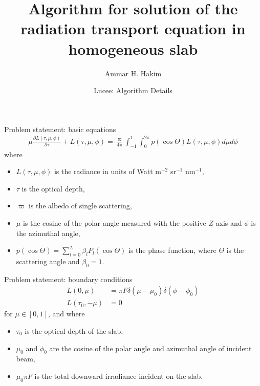 \documentclass[14]{beamer}
\title[RTE in homogeneous slab]{%
  Algorithm for solution of the radiation transport equation in homogeneous slab}
\author{Ammar H. Hakim}
\date[Lucee]
{Lucee: Algorithm Details}
\newcommand{\pfrac}[2]{\frac{\partial #1}{\partial #2}}
\begin{document}
\begin{frame}
  \titlepage
\end{frame}

\begin{frame}{Problem statement: basic equations}
  \begin{align}
    \mu\pfrac{L(\tau,\mu,\phi)}{\tau} + L(\tau,\mu,\phi)
    =
    \frac{\varpi}{4\pi}
    \int_{-1}^1 \int_0^{2\pi}
    p(\cos\Theta) L(\tau,\mu,\phi) d\mu d\phi
  \end{align}
  where
  \begin{itemize}
  \item $L(\tau,\mu,\phi)$ is the radiance in units of Watt m$^{-2}$
    sr$^{-1}$ nm$^{-1}$,
  \item $\tau$ is the optical depth,
  \item $\varpi$ is the albedo of single scattering,
  \item $\mu$ is the cosine of the polar angle measured with the
    positive $Z$-axis and $\phi$ is the azimuthal angle,
  \item $p(\cos\Theta) = \sum_{l=0}^L\beta_lP_l(\cos\Theta)$ is the
    phase function, where $\Theta$ is the scattering angle and
    $\beta_0=1$.
  \end{itemize}
\end{frame}

\begin{frame}{Problem statement: boundary conditions}
  \begin{align}
    L(0, \mu) &= \pi F \delta(\mu-\mu_0) \delta(\phi-\phi_0) \\
    L(\tau_0, -\mu) &= 0
  \end{align}
  for $\mu\in [0,1]$, and where
  \begin{itemize}
  \item $\tau_0$ is the optical depth of the slab,
  \item $\mu_0$ and $\phi_0$ are the cosine of the polar angle and
    azimuthal angle of incident beam,
  \item $\mu_0\pi F$ is the total downward irradiance incident on the
    slab.
  \end{itemize}
\end{frame}
\end{document}
